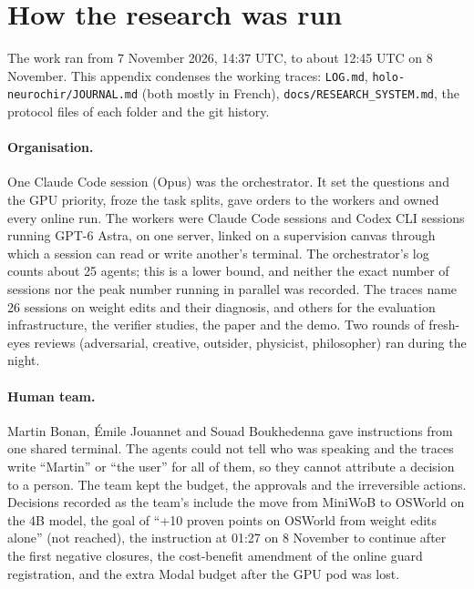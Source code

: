 \section{How the research was run}
\label{sec:method}
The work ran from 7 November 2026, 14:37 UTC, to about 12:45 UTC on 8 November. This appendix condenses the working traces: \texttt{LOG.md}, \texttt{holo-neurochir/JOURNAL.md} (both mostly in French), \texttt{docs/RESEARCH\_SYSTEM.md}, the protocol files of each folder and the git history. %

\paragraph{Organisation.} One Claude Code session (Opus) was the orchestrator. It set the questions and the GPU priority, froze the task splits, gave orders to the workers and owned every online run. The workers were Claude Code sessions and Codex CLI sessions running GPT-6 Astra, on one server, linked on a supervision canvas through which a session can read or write another's terminal. The orchestrator's log counts about 25 agents; this is a lower bound, and neither the exact number of sessions nor the peak number running in parallel was recorded. The traces name 26 sessions on weight edits and their diagnosis, and others for the evaluation infrastructure, the verifier studies, the paper and the demo. Two rounds of fresh-eyes reviews (adversarial, creative, outsider, physicist, philosopher) ran during the night. %

\paragraph{Human team.} Martin Bonan, \'Emile Jouannet and Souad Boukhedenna gave instructions from one shared terminal. The agents could not tell who was speaking and the traces write ``Martin'' or ``the user'' for all of them, so they cannot attribute a decision to a person. The team kept the budget, the approvals and the irreversible actions. Decisions recorded as the team's include the move from MiniWoB to OSWorld on the 4B model, the goal of ``+10 proven points on OSWorld from weight edits alone'' (not reached), the instruction at 01:27 on 8 November to continue after the first negative closures, the cost-benefit amendment of the online guard registration, and the extra Modal budget after the GPU pod was lost. %

